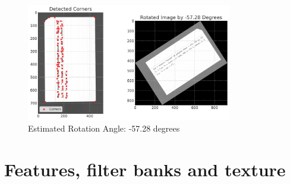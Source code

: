 \documentclass[12pt]{article}
\begin{document}

\begin{figure}[h]
    \centering
    \includegraphics[width=0.8\textwidth]{pics/a6-2.1.png} 
    \caption{Estimated Rotation Angle: -57.28 degrees}
    \label{rot}
\end{figure}


\section{Features, filter banks and texture}
\end{document}
